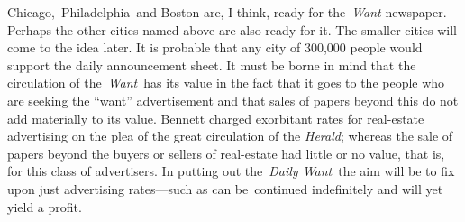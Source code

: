 \documentclass[twoside,symmetric,nobib,justified]{tufte-book}
\begin{document}
Chicago,~Philadelphia~and Boston are, I think, ready for
the~\emph{Want} newspaper. Perhaps the other cities named above are also
ready for it. The smaller cities will come to the idea later. It is
probable that any city of 300,000 people would support the daily
announcement sheet. It must be borne in mind that the circulation of
the~\emph{Want}~has its value in the fact that it goes to the people who
are seeking the ``want'' advertisement and that sales of papers beyond
this do not add materially to its value. Bennett charged exorbitant
rates for real-estate advertising on the plea of the great circulation
of the \emph{Herald}; whereas the sale of papers beyond the buyers or
sellers of real-estate had little or no value, that is, for this class
of advertisers. In putting out the~\emph{Daily Want}~the aim will be to
fix upon just advertising rates---such as can be~continued indefinitely
and will yet yield a profit.~
\end{document}
